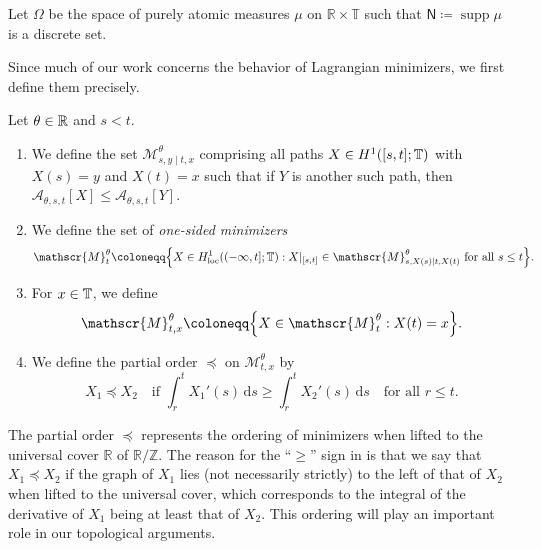 \documentclass[AHL,Unicode,longabstracts]{cedram}
\newcommand*\ssN{\mathsf{N}}
\newcommand*\scM{\mathscr{M}}
\newcommand*\TT{\mathbb{T}}
\newcommand*\RR{\mathbb{R}}
\newcommand*\ZZ{\mathbb{Z}}
\newcommand{\clA}{\mathcal{A}}
\newcommand*\st{\mathrel{:}}
\DeclareMathOperator{\supp}{supp}
\DeclareMathOperator{\locc}{loc}
\newcommand*\dif{\mathrm{d}}
\let\oldin\in
\renewcommand{\in}{\mathchoice{\oldin}{\oldin}{\,\oldin\,}{\,\oldin\,}}
\let\originalleft\left
\let\originalright\right
\renewcommand{\left}{\mathopen{}\mathclose\bgroup\originalleft}
\renewcommand{\right}{\aftergroup\egroup\originalright}
\newcommand*\TT{\mathbb{T}}
\newcommand*\RR{\mathbb{R}}
\newcommand*\ZZ{\mathbb{Z}}
\begin{document}
\begin{defi}
Let $\Omega$ be the space of purely atomic measures $\mu$ on $\RR\times\TT$ such that $\ssN\coloneqq\supp\mu$ is a discrete set.
\end{defi}

Since much of our work concerns the behavior of Lagrangian minimizers, we first define them precisely.

\begin{defi}\label{def:minimizers}
Let $\theta\in\RR$ and $s<t$.
\begin{enumerate}
\item We define the set $\scM_{s,y\mid t,x}^{\theta}$ comprising all paths $X\in H^{1}([s,t];\TT)$ with $X(s)=y$ and $X(t)=x$ such that if $Y$ is another such path, then $\clA_{\theta,s,t}[X]\le\clA_{\theta,s,t}[Y]$.
\item We define the set of \emph{one-sided minimizers}
\[
\scM_{t}^{\theta}\coloneqq\left\{X\in H_{\locc}^{1}((-\infty,t];\TT)\st X|_{[s,t]}\in\scM_{s,X(s)\mid t,X(t)}^{\theta}\text{ for all }s\le t\right\}.
\]
\item For $x\in\TT$, we define
\[
\scM_{t,x}^{\theta}\coloneqq\left\{X\in\scM_{t}^{\theta}\st X(t)=x\right\}.
\]
\item We define the partial order $\preccurlyeq$ on $\scM_{t,x}^{\theta}$ by
\begin{equation}\label{eq:partialorderdef}
X_{1}\preccurlyeq X_{2}\quad\text{if }\int_{r}^{t}X_{1}'(s)\,\dif s\ge\int_{r}^{t}X_{2}'(s)\,\dif s\quad\text{for all }r\le t.
\end{equation}
\end{enumerate}
\end{defi}

The partial order $\preccurlyeq$ represents the ordering of minimizers when lifted to the universal cover $\RR$ of $\RR/\ZZ$. The reason for the ``$\ge$'' sign in  is that we say that $X_{1}\preccurlyeq X_{2}$ if the graph of $X_{1}$ lies (not necessarily strictly) to the left of that of $X_{2}$ when lifted to the universal cover, which corresponds to the integral of the derivative of $X_{1}$ being at least that of $X_{2}$. This ordering will play an important role in our topological arguments.
\end{document}

